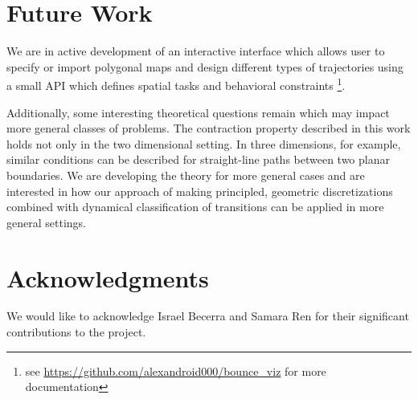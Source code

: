 \documentclass[conference]{IEEEtran}
\begin{document}
\section{Future Work}

We are in active development of an interactive interface which allows user to specify or
import polygonal maps and design different types of trajectories using a small
API which defines spatial tasks and behavioral constraints \footnote{see
\url{https://github.com/alexandroid000/bounce_viz} for more documentation}.

Additionally, some interesting theoretical questions remain which may impact more
general classes of problems. The contraction property described in this work holds not only in the two
dimensional setting. In three dimensions, for example, similar conditions can be
described for straight-line paths between two planar boundaries. We are
developing the theory for more general cases and are interested
in how our approach of making principled, geometric discretizations combined with
dynamical classification of transitions can be applied in more general settings.
 
\section*{Acknowledgments}

We would like to acknowledge Israel Becerra and Samara Ren for their
significant contributions to the project.



\end{document}
